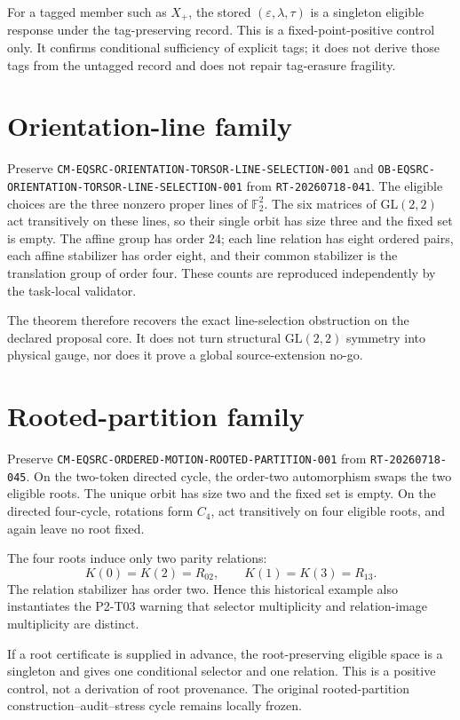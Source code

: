 \documentclass[11pt]{article}
\begin{document}
For a tagged member such as \(X_+\), the stored
\((\varepsilon,\lambda,\tau)\) is a singleton eligible response under the
tag-preserving record. This is a fixed-point-positive control only. It confirms
conditional sufficiency of explicit tags; it does not derive those tags from
the untagged record and does not repair tag-erasure fragility.

\section{Orientation-line family}

Preserve
\texttt{CM-EQSRC-ORIENTATION-TORSOR-LINE-SELECTION-001} and
\texttt{OB-EQSRC-ORIENTATION-TORSOR-LINE-SELECTION-001} from
\texttt{RT-20260718-041}. The eligible choices are the three nonzero proper
lines of \(\mathbb F_2^2\). The six matrices of
\(\mathrm{GL}(2,2)\) act transitively on these lines, so their single orbit has
size three and the fixed set is empty. The affine group has order 24; each line
relation has eight ordered pairs, each affine stabilizer has order eight, and
their common stabilizer is the translation group of order four. These counts
are reproduced independently by the task-local validator.

The theorem therefore recovers the exact line-selection obstruction on the
declared proposal core. It does not turn structural \(\mathrm{GL}(2,2)\)
symmetry into physical gauge, nor does it prove a global source-extension
no-go.

\section{Rooted-partition family}

Preserve \texttt{CM-EQSRC-ORDERED-MOTION-ROOTED-PARTITION-001} from
\texttt{RT-20260718-045}. On the two-token directed cycle, the order-two
automorphism swaps the two eligible roots. The unique orbit has size two and
the fixed set is empty. On the directed four-cycle, rotations form \(C_4\),
act transitively on four eligible roots, and again leave no root fixed.

The four roots induce only two parity relations:
\[
 K(0)=K(2)=R_{02},\qquad K(1)=K(3)=R_{13}.
\]
The relation stabilizer has order two. Hence this historical example also
instantiates the P2-T03 warning that selector multiplicity and relation-image
multiplicity are distinct.

If a root certificate is supplied in advance, the root-preserving eligible
space is a singleton and gives one conditional selector and one relation. This
is a positive control, not a derivation of root provenance. The original
rooted-partition construction--audit--stress cycle remains locally frozen.
\end{document}
